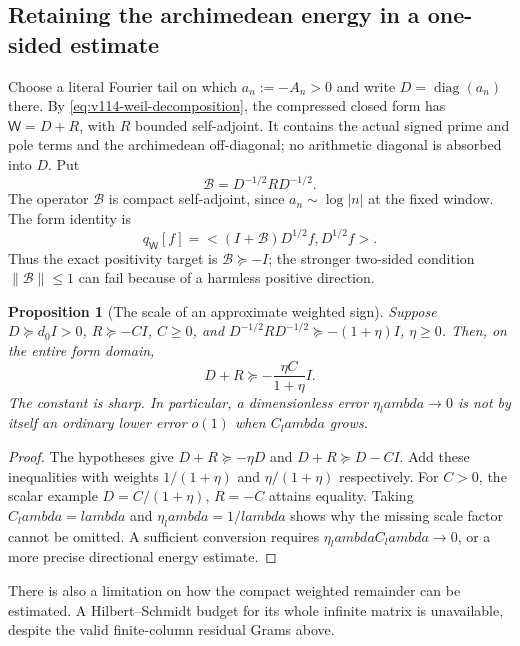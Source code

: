\documentclass[11pt]{article}
\def\lambda{lambda}%
\def\ip#1#2{<#1,#2>}%
\newtheorem{proposition}[theorem]{Proposition}
\theoremstyle{remark}
\newcommand{\ip}[2]{\left\langle #1,#2\right\rangle}
\begin{document}
\subsection{Retaining the archimedean energy in a one-sided estimate}

Choose a literal Fourier tail on which $a_n:=-A_n>0$ and write
$D=\operatorname{diag}(a_n)$ there. By
\eqref{eq:v114-weil-decomposition}, the compressed closed form has
$\mathsf W=D+R$, with $R$ bounded self-adjoint. It contains the
actual signed prime and pole terms and the archimedean off-diagonal;
no arithmetic diagonal is absorbed into $D$. Put
\begin{equation}\label{eq:v120-weighted-remainder}
 \mathcal B=D^{-1/2}R D^{-1/2}.
\end{equation}
The operator $\mathcal B$ is compact self-adjoint, since
$a_n\sim\log|n|$ at the fixed window. The form identity is
\[
 q_{\mathsf W}[f]
 =\ip{(I+\mathcal B)D^{1/2}f}{D^{1/2}f}.
\]
Thus the exact positivity target is $\mathcal B\succeq-I$;
the stronger two-sided condition $\|\mathcal B\|\le1$ can fail
because of a harmless positive direction.

\begin{proposition}[The scale of an approximate weighted sign]
\label{prop:v120-weighted-error}
Suppose $D\succeq d_0I>0$, $R\succeq-CI$, $C\ge0$, and
$D^{-1/2}RD^{-1/2}\succeq-(1+\eta)I$, $\eta\ge0$.
Then, on the entire form domain,
\begin{equation}\label{eq:v120-weighted-error}
 D+R\succeq-\frac{\eta C}{1+\eta}I.
\end{equation}
The constant is sharp. In particular, a dimensionless error
$\eta_\lambda\to0$ is not by itself an ordinary lower error
$o(1)$ when $C_\lambda$ grows.
\end{proposition}
\begin{proof}
The hypotheses give $D+R\succeq-\eta D$ and
$D+R\succeq D-CI$. Add these inequalities with weights
$1/(1+\eta)$ and $\eta/(1+\eta)$ respectively. For $C>0$,
the scalar example $D=C/(1+\eta)$, $R=-C$ attains equality.
Taking $C_\lambda=\lambda$ and $\eta_\lambda=1/\lambda$
shows why the missing scale factor cannot be omitted. A sufficient
conversion requires $\eta_\lambda C_\lambda\to0$, or a more
precise directional energy estimate.
\end{proof}

There is also a limitation on how the compact weighted remainder can
be estimated. A Hilbert--Schmidt budget for its whole infinite matrix
is unavailable, despite the valid finite-column residual Grams above.
\end{document}
